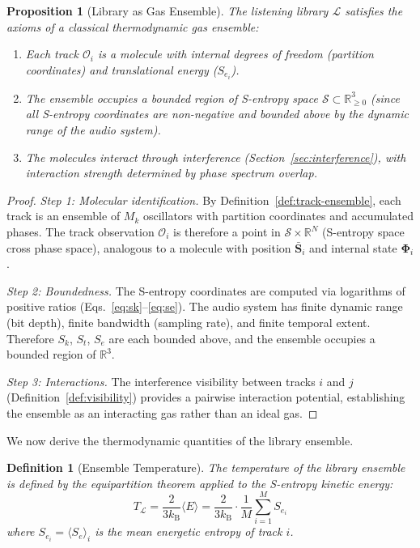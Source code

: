 \documentclass[11pt,twocolumn,a4paper]{article}
\newtheorem{proposition}[theorem]{Proposition}
\newtheorem{definition}[theorem]{Definition}
\newcommand{\kB}{k_{\mathrm{B}}}
\newcommand{\Sk}{S_k}
\newcommand{\St}{S_t}
\newcommand{\Se}{S_e}
\newcommand{\R}{\mathbb{R}}
\newcommand{\Lib}{\mathcal{L}}
\newcommand{\Spec}{\bm{\Phi}}
\begin{document}
\begin{proposition}[Library as Gas Ensemble]
\label{prop:gas-ensemble}
The listening library $\Lib$ satisfies the axioms of a classical
thermodynamic gas ensemble:
\begin{enumerate}[label=(\roman*),leftmargin=*]
\item Each track $\mathcal{O}_i$ is a molecule with internal degrees
  of freedom (partition coordinates) and translational energy
  ($\Se_i$).
\item The ensemble occupies a bounded region of S-entropy space
  $\mathcal{S} \subset \R_{\geq 0}^3$ (since all S-entropy
  coordinates are non-negative and bounded above by the dynamic range
  of the audio system).
\item The molecules interact through interference (Section~\ref{sec:interference}), with interaction strength
  determined by phase spectrum overlap.
\end{enumerate}
\end{proposition}

\begin{proof}
\textit{Step 1: Molecular identification.}
By Definition~\ref{def:track-ensemble}, each track is an ensemble of
$M_k$ oscillators with partition coordinates and accumulated phases.
The track observation $\mathcal{O}_i$ is therefore a point in
$\mathcal{S} \times \R^N$ (S-entropy space cross phase space),
analogous to a molecule with position $\bar{\mathbf{S}}_i$ and
internal state $\Spec_i$.

\textit{Step 2: Boundedness.}
The S-entropy coordinates are computed via logarithms of positive
ratios (Eqs.~\eqref{eq:sk}--\eqref{eq:se}). The audio system has
finite dynamic range (bit depth), finite bandwidth (sampling rate), and
finite temporal extent. Therefore $\Sk$, $\St$, $\Se$ are each bounded
above, and the ensemble occupies a bounded region of $\R^3$.

\textit{Step 3: Interactions.}
The interference visibility between tracks $i$ and $j$
(Definition~\ref{def:visibility}) provides a pairwise interaction
potential, establishing the ensemble as an interacting gas rather than
an ideal gas.
\end{proof}

We now derive the thermodynamic quantities of the library ensemble.

\begin{definition}[Ensemble Temperature]
\label{def:temperature}
The temperature of the library ensemble is defined by the equipartition
theorem applied to the S-entropy kinetic energy:
\begin{equation}
  T_{\Lib} = \frac{2}{3\kB} \langle E \rangle
  = \frac{2}{3\kB} \cdot \frac{1}{M} \sum_{i=1}^{M} \Se_i
  \label{eq:temperature}
\end{equation}
where $\Se_i = \langle \Se \rangle_i$ is the mean energetic entropy of
track $i$.
\end{definition}
\end{document}
